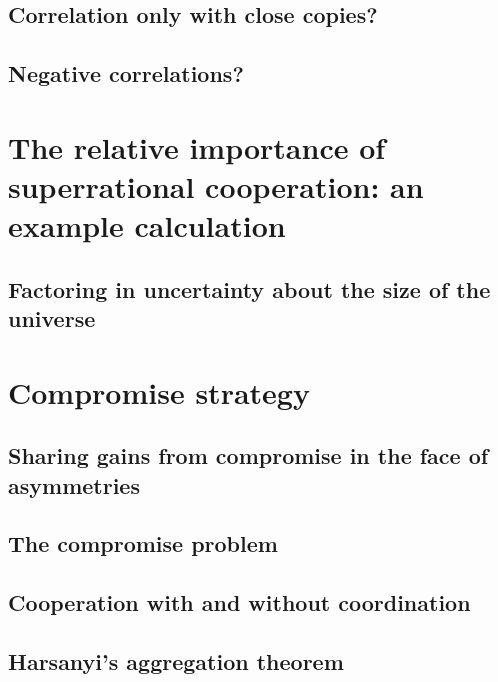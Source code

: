 \documentclass{book}
\begin{document}
\subsection{Correlation only with close copies?}
\label{Correlation only with close copies?}

\subsection{Negative correlations?}
\label{Negative correlations?}

\section{The relative importance of superrational cooperation: an example calculation}
\label{The relative importance of superrational cooperation: an example calculation}

\subsection{Factoring in uncertainty about the size of the universe}
\label{Factoring in uncertainty about the size of the universe}

\section{Compromise strategy}
\label{Compromise strategy}

\subsection{Sharing gains from compromise in the face of asymmetries}
\label{Sharing gains from compromise in the face of asymmetries}

\subsection{The compromise problem}
\label{The compromise problem}

\subsection{Cooperation with and without coordination}
\label{Cooperation with and without coordination}

\subsection{Harsanyi's aggregation theorem}
\label{Harsanyi's aggregation theorem}
\end{document}
